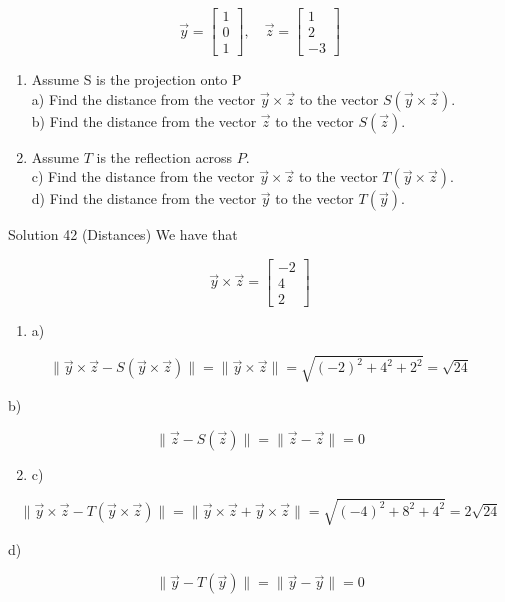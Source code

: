 \documentclass[10pt]{article}
\begin{document}
$$
\vec{y}=\left[\begin{array}{l}
1 \\
0 \\
1
\end{array}\right], \quad \vec{z}=\left[\begin{array}{c}
1 \\
2 \\
-3
\end{array}\right]
$$

\begin{enumerate}
  \item Assume S is the projection onto P\\
a) Find the distance from the vector $\vec{y} \times \vec{z}$ to the vector $S(\vec{y} \times \vec{z})$.\\
b) Find the distance from the vector $\vec{z}$ to the vector $S(\vec{z})$.
  \item Assume $T$ is the reflection across $P$.\\
c) Find the distance from the vector $\vec{y} \times \vec{z}$ to the vector $T(\vec{y} \times \vec{z})$.\\
d) Find the distance from the vector $\vec{y}$ to the vector $T(\vec{y})$.
\end{enumerate}

Solution 42 (Distances) We have that

$$
\vec{y} \times \vec{z}=\left[\begin{array}{c}
-2 \\
4 \\
2
\end{array}\right]
$$

\begin{enumerate}
  \item a)
\end{enumerate}

$$
\|\vec{y} \times \vec{z}-S(\vec{y} \times \vec{z})\|=\|\vec{y} \times \vec{z}\|=\sqrt{(-2)^{2}+4^{2}+2^{2}}=\sqrt{24}
$$

b)

$$
\|\vec{z}-S(\vec{z})\|=\|\vec{z}-\vec{z}\|=0
$$

\begin{enumerate}
  \setcounter{enumi}{1}
  \item c)
\end{enumerate}

$$
\|\vec{y} \times \vec{z}-T(\vec{y} \times \vec{z})\|=\|\vec{y} \times \vec{z}+\vec{y} \times \vec{z}\|=\sqrt{(-4)^{2}+8^{2}+4^{2}}=2 \sqrt{24}
$$

d)

$$
\|\vec{y}-T(\vec{y})\|=\|\vec{y}-\vec{y}\|=0
$$
\end{document}
